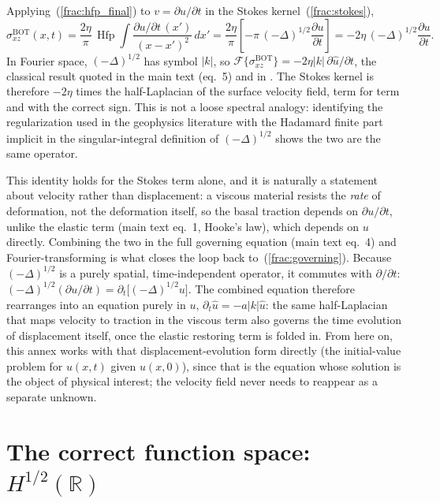 \documentclass{article}
\newcommand{\Hfp}{\operatorname{Hfp}}
\begin{document}
Applying~(\ref{frac:hfp_final}) to $v=\partial u/\partial t$ in the Stokes
kernel~(\ref{frac:stokes}),
\begin{equation}
\sigma_{xz}^{\mathrm{BOT}}(x,t)
= \frac{2\eta}{\pi}\,\Hfp\!\int\frac{\partial u/\partial t\,(x')}{(x-x')^2}\,dx'
= \frac{2\eta}{\pi}\left[-\pi\,(-\Delta)^{1/2}\frac{\partial u}{\partial t}\right]
= -2\eta\,(-\Delta)^{1/2}\frac{\partial u}{\partial t}.
\label{frac:kernel-identity}
\end{equation}
In Fourier space, $(-\Delta)^{1/2}$ has symbol $|k|$, so
$\mathcal{F}\{\sigma_{xz}^{\mathrm{BOT}}\} = -2\eta|k|\,\partial\hat u/\partial t$,
the classical result quoted in the main text (eq.~5) and in
\citet{savage1978asthenosphere}. The Stokes kernel is therefore $-2\eta$
times the half-Laplacian of the surface velocity field, term for term and
with the correct sign. This is not a loose spectral analogy: identifying
the regularization used in the geophysics literature with the Hadamard
finite part implicit in the singular-integral definition of
$(-\Delta)^{1/2}$ shows the two are the same operator.

This identity holds for the Stokes term alone, and it is naturally a
statement about velocity rather than displacement: a viscous material
resists the \emph{rate} of deformation, not the deformation itself, so the
basal traction depends on $\partial u/\partial t$, unlike the elastic term
(main text eq.~1, Hooke's law), which depends on $u$ directly. Combining
the two in the full governing equation (main text eq.~4) and
Fourier-transforming is what closes the loop back to~(\ref{frac:governing}).
Because $(-\Delta)^{1/2}$ is a purely spatial, time-independent operator,
it commutes with $\partial/\partial t$:
$(-\Delta)^{1/2}(\partial u/\partial t) = \partial_t\big[(-\Delta)^{1/2}u\big]$.
The combined equation therefore rearranges into an equation purely in $u$,
$\partial_t\hat u = -a|k|\hat u$: the same half-Laplacian that maps
velocity to traction in the viscous term also governs the time evolution
of displacement itself, once the elastic restoring term is folded in. From
here on, this annex works with that displacement-evolution form directly
(the initial-value problem for $u(x,t)$ given $u(x,0)$), since that is the
equation whose solution is the object of physical interest; the velocity
field never needs to reappear as a separate unknown.

\section{The correct function space: $H^{1/2}(\mathbb{R})$}
\label{sec:sobolev}
\end{document}
